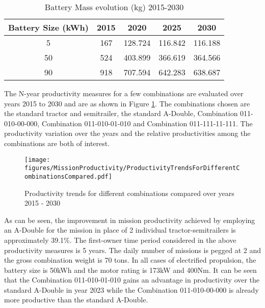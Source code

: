 \documentclass[ExampleMasters.tex]{subfiles}
\begin{document}
	\begin{table}[ht]
		\centering 
		\begin{tabular}{c c c c c}
			\hline
			Battery Size (kWh) & 2015 & 2020 & 2025 & 2030\\ 
			\hline
			5 & 167 & 128.724 & 116.842 & 116.188\\
			50 & 524 & 403.899 & 366.619 & 364.566\\
			90 & 918 & 707.594 & 642.283 & 638.687\\
			\hline 
		\end{tabular}
		\caption{Battery Mass evolution (kg) 2015-2030 \cite{ElementEnergy}} 
		\label{table:ParameterSensitivityBatteryMass} 
	\end{table}

	The N-year productivity measures for a few combinations are evaluated over years 2015 to 2030 and are as shown in Figure \ref{ProductivityComb20152030}. The combinations chosen are the standard tractor and semitrailer, the standard A-Double, Combination 011-010-00-000, Combination 011-010-01-010 and Combination 011-111-11-111. The productivity variation over the years and the relative productivities among the combinations are both of interest.\\

	\begin{figure}[ht!]
		\centering
		\texttt{[image: figures/MissionProductivity/ProductivityTrendsForDifferentCombinationsCompared.pdf]}
		\caption{Productivity trends for different combinations compared over years 2015 - 2030}
		\label{ProductivityComb20152030}
	\end{figure}

	As can be seen, the improvement in mission productivity achieved by employing an A-Double for the mission in place of 2 individual tractor-semitrailers is approximately 39.1\%. The first-owner time period considered in the above productivity measures is 5 years. The daily number of missions is pegged at 2 and the gross combination weight is 70 tons. In all cases of electrified propulsion, the battery size is 50kWh and the motor rating is 173kW and 400Nm. It can be seen that the Combination 011-010-01-010 gains an advantage in productivity over the standard A-Double in year 2023 while the Combination 011-010-00-000 is already more productive than the standard A-Double.\\
\end{document}
